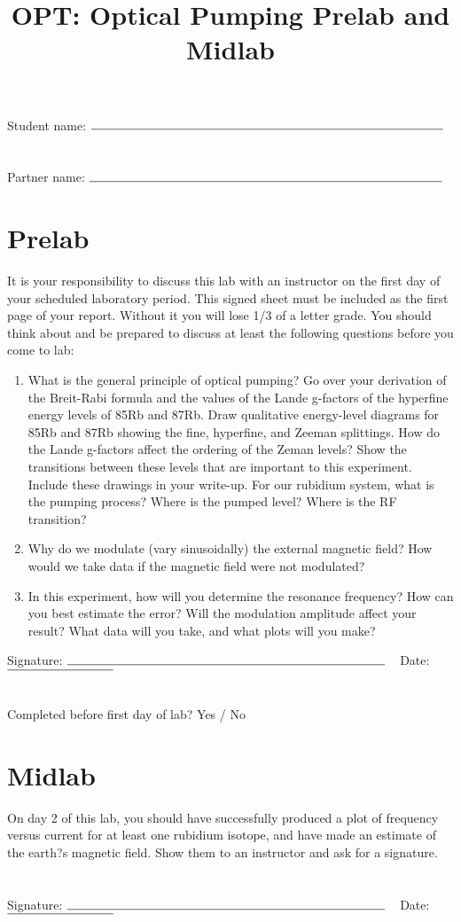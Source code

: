 \documentclass[11pt]{article}
\title{OPT: Optical Pumping Prelab and Midlab}
\author{}
\date{}
\begin{document}
\maketitle
Student name: $\rule{10cm}{0.15mm}$\\\\\\
Partner name: $\rule{10cm}{0.15mm}$
\section*{Prelab}
It is your responsibility to discuss this lab with an instructor on the first day of your scheduled laboratory period. This signed sheet must be included as the first page of your report. Without it you will lose 1/3 of a letter grade. You should think about and be prepared to discuss at least the following questions before you come to lab:
\begin{enumerate}
\item
What is the general principle of optical pumping? Go over your derivation of the Breit-Rabi formula and the values of the Lande g-factors of the hyperfine energy levels of 85Rb and 87Rb. Draw qualitative energy-level diagrams for 85Rb and 87Rb showing the fine, hyperfine, and Zeeman splittings. How do the Lande g-factors affect the ordering of the Zeman levels? Show the transitions between these levels that are important to this experiment. Include these drawings in your write-up. For our rubidium system, what is the pumping process? Where is the pumped level? Where is the RF transition?
\item
Why do we modulate (vary sinusoidally) the external magnetic field? How would we take data if the magnetic field were not modulated?
\item
In this experiment, how will you determine the resonance frequency? How can you best estimate the error? Will the modulation amplitude affect your result? What data will you take, and what plots will you make?\\
\end{enumerate}
Signature: $\rule{9cm}{0.15mm}\;\;\;$ Date: $\rule{3cm}{0.15mm}$\\\\\\
Completed before first day of lab? Yes / No

\section*{Midlab}
On day 2 of this lab, you should have successfully produced a plot of frequency versus current for at least one rubidium isotope, and have made an estimate of the earth?s magnetic field. Show them to an instructor and ask for a signature.\\\\\\
Signature: $\rule{9cm}{0.15mm}\;\;\;$ Date: $\rule{3cm}{0.15mm}$
\end{document}
